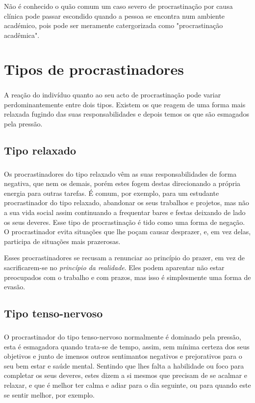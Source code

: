 \documentclass{report}
\begin{document}
Não é conhecido o quão comum um caso severo de procrastinação por causa clínica pode passar escondido quando a pessoa se encontra num ambiente académico, pois pode ser meramente catergorizada como "procrastinação acadêmica".



\chapter{Tipos de procrastinadores}
\label{chap.tipos}

\paragraph{} 
A reação do indivíduo quanto ao seu acto de procrastinação pode variar perdominantemente entre dois tipos. Existem os que reagem de uma forma mais relaxada fugindo das suas responsabilidades e depois temos os que são esmagados pela pressão.
\section{Tipo relaxado}
\label{chap.relaxado}

\paragraph{}
Os procrastinadores do tipo relaxado vêm as suas responsabilidades de forma negativa, que nem os demais, porém estes fogem destas direcionando a própria energia para outras tarefas. É comum, por exemplo, para um estudante procrastinador do tipo relaxado, abandonar os seus trabalhos e projetos, mas não a sua vida social assim continuando a frequentar bares e festas deixando de lado os seus deveres. Esse tipo de procrastinação é tido como uma forma de negação. O procrastinador evita situações que lhe poçam causar desprazer, e, em vez delas, participa de situações mais prazerosas.  

Esses procrastinadores se recusam a renunciar ao princípio do prazer, em vez de sacrificarem-se no \textit{princípio da realidade}. Eles podem aparentar não estar preocupados com o trabalho e com prazos, mas isso é simplesmente uma forma de evasão.

\section {Tipo tenso-nervoso}

\paragraph{} O procrastinador do tipo tenso-nervoso normalmente é dominado pela pressão, esta é esmagadora quando trata-se de tempo, assim, sem mínima certeza dos seus objetivos e junto de imensos outros sentimantos negativos e prejorativos para o seu bem estar e saúde mental. Sentindo que lhes falta a habilidade ou foco para completar os seus deveres, estes dizem a si mesmos que precisam de se acalmar e relaxar, e que é melhor ter calma e adiar para o dia seguinte, ou para quando este se sentir melhor, por exemplo.
\end{document}

